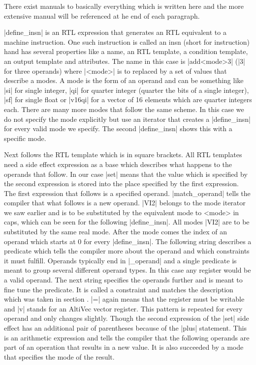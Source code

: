 There exist manuals to basically everything which is written here and the more extensive manual will be referenced at he end of each paragraph.

|define_insn| is an RTL expression that generates an RTL equivalent to a machine instruction.
One such instruction is called an insn (short for instruction) hand has several properties like a name, an RTL template, a condition template, an output template and attributes. 
The name in this case is |add<mode>3| (|3| for three operands) where |<mode>| is to replaced by a set of values that describe a modes. 
A mode is the form of an operand and can be something like |si| for single integer, |qi| for quarter integer (quarter the bits of a single integer), |sf| for single float or |v16qi| for a vector of 16 elements which are quarter integers each. 
There are many more modes that follow the same scheme.
In this case we do not specify the mode explicitly but use an iterator that creates a |define_insn| for every valid mode we specify. 
The second |define_insn| shows this with a specific mode.

Next follows the RTL template which is in square brackets.
All RTL templates need a side effect expression as a base which describes what happens to the operands that follow.
In our case |set| means that the value which is specified by the second expression is stored into the place specified by the first expression. 
The first expression that follows is a specified operand.
|match_operand| tells the compiler that what follows is a new operand.
|VI2| belongs to the mode iterator we saw earlier and is to be substituted by the equivalent mode to <mode> in caps, which can be seen for the following |define_insn|.
All modes |VI2| are to be substituted by the same real mode.
After the mode comes the index of an operand which starts at 0 for every |define_insn|.
The following string describes a predicate which tells the compiler more about the operand and which constraints it must fulfill.
Operands typically end in |_operand| and a single predicate is meant to group several different operand types.
In this case any register would be a valid operand. 
The next string specifies the operands further and is meant to fine tune the predicate.
It is called a constraint and matches the description which was taken in section .
|=| again means that the register must be writable and |v| stands for an AltiVec vector register.
This pattern is repeated for every operand and only changes slightly.
Though the second expression of the |set| side effect has an additional pair of parentheses because of the |plus| statement.
This is an arithmetic expression and tells the compiler that the following operands are part of an operation that results in a new value.
It is also succeeded by a mode that specifies the mode of the result.

